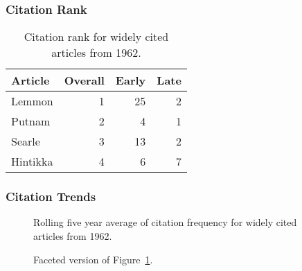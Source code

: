 \documentclass[
  10pt,
  letterpaper,
  DIV=11,
  numbers=noendperiod,
  twoside]{scrartcl}
\begin{document}
\subsubsection*{Citation Rank}\label{sec-rank-1962}

\begin{longtable}[]{@{}lrrr@{}}

\caption{\label{tbl-citation-rank-1962}Citation rank for widely cited
articles from 1962.}

\tabularnewline

\toprule\noalign{}
Article & Overall & Early & Late \\
\midrule\noalign{}
\endhead
\bottomrule\noalign{}
\endlastfoot
Lemmon & 1 & 25 & 2 \\
Putnam & 2 & 4 & 1 \\
Searle & 3 & 13 & 2 \\
Hintikka & 4 & 6 & 7 \\

\end{longtable}

\subsubsection*{Citation Trends}\label{sec-trends-1962}

\begin{figure}


\caption{\label{fig-citation-spaghetti-1962}Rolling five year average of
citation frequency for widely cited articles from 1962.}

\end{figure}%

\begin{figure}


\caption{\label{fig-citation-facet-1962}Faceted version of
Figure~\ref{fig-citation-spaghetti-1962}.}

\end{figure}%

\newpage
\end{document}
